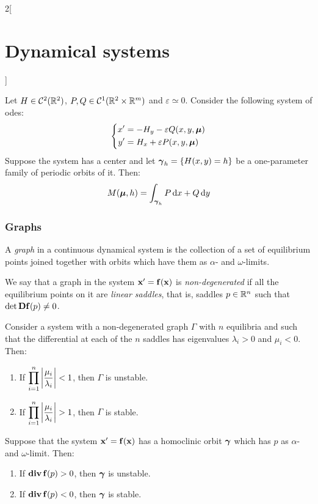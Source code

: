 \documentclass[../../../main_math.tex]{subfiles}
\begin{document}
\begin{multicols}{2}[\section{Dynamical systems}]
\begin{theorem}
  \end{theorem}
  \begin{corollary}
    Let $H\in\mathcal{C}^2(\mathbb{R}^2)$, $P,Q\in\mathcal{C}^1(\mathbb{R}^2\times\mathbb{R}^m)$ and $\varepsilon\simeq 0$. Consider the following system of odes:
    \begin{equation*}
      \left\{
      \begin{aligned}
        x' & =-H_y -\varepsilon Q(x,y,\boldsymbol{\mathrm{\mu}}) \\
        y' & =H_x +\varepsilon P(x,y,\boldsymbol{\mathrm{\mu}})
      \end{aligned}
      \right.
    \end{equation*}
    Suppose the system has a center and let $\boldsymbol{\mathrm{\gamma}}_h=\{H(x,y)=h\}$ be a one-parameter family of periodic orbits of it. Then: $$M(\boldsymbol{\mathrm{\mu}},h)=\int_{\boldsymbol{\mathrm{\gamma}}_h}P\dd{x}+Q\dd{y}$$
  \end{corollary}
  \subsubsection{Graphs}
  \begin{definition}
    A \emph{graph} in a continuous dynamical system is the collection of a set of equilibrium points joined together with orbits which have them as $\alpha$- and $\omega$-limits.
  \end{definition}
  \begin{definition}
    We say that a graph in the system $\boldsymbol{\mathrm{x}}'=\boldsymbol{\mathrm{f}}(\boldsymbol{\mathrm{x}})$ is \emph{non-degenerated} if all the equilibrium points on it are \emph{linear saddles}, that is, saddles $p\in\mathbb{R}^n$ such that $\det\boldsymbol{\mathrm{Df}}(p)\ne 0$.
  \end{definition}
  \begin{proposition}
    Consider a system with a non-degenerated graph $\Gamma$ with $n$ equilibria and such that the differential at each of the $n$ saddles has eigenvalues $\lambda_i > 0$ and $\mu_i<0$. Then:
    \begin{enumerate}
      \item If $\displaystyle\prod_{i=1}^n\abs{\frac{\mu_i}{\lambda_i}}<1$, then $\Gamma$ is unstable.
      \item If $\displaystyle\prod_{i=1}^n\abs{\frac{\mu_i}{\lambda_i}}>1$, then $\Gamma$ is stable.
    \end{enumerate}
  \end{proposition}
  \begin{corollary}
    Suppose that the system $\boldsymbol{\mathrm{x}}'=\boldsymbol{\mathrm{f}}(\boldsymbol{\mathrm{x}})$ has a homoclinic orbit $\boldsymbol{\mathrm{\gamma}}$ which has $p$ as $\alpha$- and $\omega$-limit. Then:
    \begin{enumerate}
      \item If $\operatorname{\boldsymbol{\mathrm{div}}} \boldsymbol{\mathrm{f}}(p)>0$, then $\boldsymbol{\mathrm{\gamma}}$ is unstable.
      \item If $\operatorname{\boldsymbol{\mathrm{div}}} \boldsymbol{\mathrm{f}}(p)<0$, then $\boldsymbol{\mathrm{\gamma}}$ is stable.
    \end{enumerate}
  \end{corollary}

\end{multicols}
\end{document}
